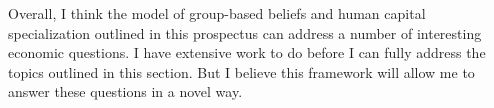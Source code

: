 


Overall, I think the model of group-based beliefs and human capital specialization outlined in this prospectus can address a number of interesting economic questions. 
I have extensive work to do before I can fully address the topics outlined in this section.
But I believe this framework will allow me to answer these questions in a novel way.
